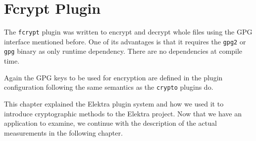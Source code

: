 \section{Fcrypt Plugin}\label{fcrypt-plugin}

The \texttt{fcrypt} plugin was written to encrypt and decrypt whole
files using the GPG interface mentioned before. One of its advantages is
that it requires the \texttt{gpg2} or \texttt{gpg} binary as only
runtime dependency. There are no dependencies at compile time.

Again the GPG keys to be used for encryption are defined in the plugin
configuration following the same semantics as the \texttt{crypto}
plugins do.

This chapter explained the Elektra plugin system and how we used it to introduce cryptographic methods to the Elektra project.
Now that we have an application to examine, we continue with the description of the actual measurements in the following chapter.
